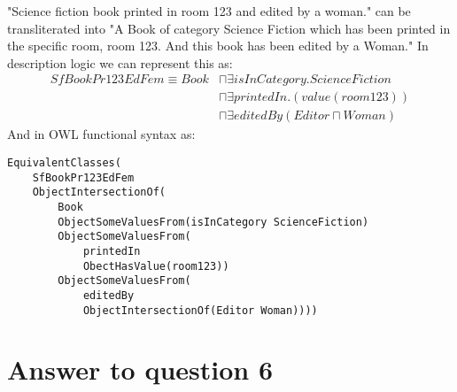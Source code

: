 \documentclass[a4paper,12pt]{article}
\begin{document}
"Science fiction book printed in room 123 and edited by a woman." can be
transliterated into "A Book of category Science Fiction which has been printed
in the specific room, room 123.  And this book has been edited by a Woman."  In
description logic we can represent this as:
\begin{align*}
SfBookPr123EdFem \equiv Book &\sqcap \exists isInCategory.ScienceFiction\\
                             &\sqcap \exists printedIn.(value(room123))\\
                             &\sqcap \exists editedBy(Editor \sqcap Woman)
\end{align*}
And in OWL functional syntax as:
\begin{Verbatim}[samepage=true]
EquivalentClasses(
    SfBookPr123EdFem
    ObjectIntersectionOf(
        Book
        ObjectSomeValuesFrom(isInCategory ScienceFiction)
        ObjectSomeValuesFrom(
            printedIn
            ObectHasValue(room123))
        ObjectSomeValuesFrom(
            editedBy
            ObjectIntersectionOf(Editor Woman))))
\end{Verbatim}

\section[Question 6]{Answer to question 6}
\end{document}
